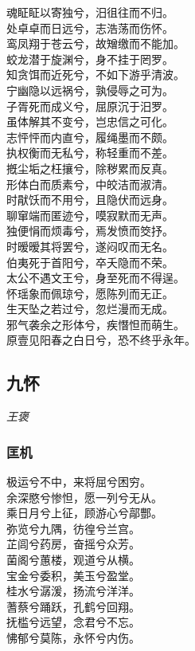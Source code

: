 \documentclass[]{article}
\begin{document}
魂眐眐以寄独兮，汨徂往而不归。\\
处卓卓而日远兮，志浩荡而伤怀。\\
鸾凤翔于苍云兮，故矰缴而不能加。\\
蛟龙潜于旋渊兮，身不挂于罔罗。\\
知贪饵而近死兮，不如下游乎清波。\\
宁幽隐以远祸兮，孰侵辱之可为。\\
子胥死而成义兮，屈原沉于汨罗。\\
虽体解其不变兮，岂忠信之可化。\\
志怦怦而内直兮，履绳墨而不颇。\\
执权衡而无私兮，称轻重而不差。\\
摡尘垢之枉攘兮，除秽累而反真。\\
形体白而质素兮，中皎洁而淑清。\\
时猒饫而不用兮，且隐伏而远身。\\
聊窜端而匿迹兮，嗼寂默而无声。\\
独便悁而烦毒兮，焉发愤而筊抒。\\
时暧暧其将罢兮，遂闷叹而无名。\\
伯夷死于首阳兮，卒夭隐而不荣。\\
太公不遇文王兮，身至死而不得逞。\\
怀瑶象而佩琼兮，愿陈列而无正。\\
生天坠之若过兮，忽烂漫而无成。\\
邪气袭余之形体兮，疾憯怛而萌生。\\
原壹见阳春之白日兮，恐不终乎永年。

\hypertarget{header-n267}{%
\subsection{九怀}\label{header-n267}}

\emph{王褒}

\hypertarget{header-n272}{%
\subsubsection{匡机}\label{header-n272}}

极运兮不中，来将屈兮困穷。\\
余深愍兮惨怛，愿一列兮无从。\\
乘日月兮上征，顾游心兮鄗酆。\\
弥览兮九隅，彷徨兮兰宫。\\
芷闾兮药房，奋摇兮众芳。\\
菌阁兮蕙楼，观道兮从横。\\
宝金兮委积，美玉兮盈堂。\\
桂水兮潺湲，扬流兮洋洋。\\
蓍蔡兮踊跃，孔鹤兮回翔。\\
抚槛兮远望，念君兮不忘。\\
怫郁兮莫陈，永怀兮内伤。
\end{document}
